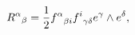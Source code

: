 \begin{equation}
{{\, R^\alpha}}_\beta ={1\over 2} 
{f^\alpha}_{\beta i}{f^i}_{\gamma\delta} e^\gamma\wedge e^\delta,
\label{fabT}
\end{equation}


